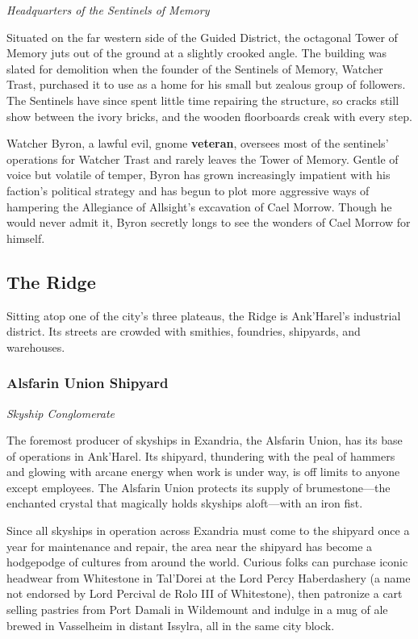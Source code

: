 \documentclass[a4paper, 11pt, bg=full, twocolumn, nooutline]{dndbook}
\begin{document}
\textit{Headquarters of the Sentinels of Memory}

Situated on the far western side of the Guided District, the octagonal Tower of Memory juts out of the ground at a slightly crooked angle. The building was slated for demolition when the founder of the Sentinels of Memory, Watcher Trast, purchased it to use as a home for his small but zealous group of followers. The Sentinels have since spent little time repairing the structure, so cracks still show between the ivory bricks, and the wooden floorboards creak with every step.

Watcher Byron, a lawful evil, gnome \textbf{veteran}, oversees most of the sentinels' operations for Watcher Trast and rarely leaves the Tower of Memory. Gentle of voice but volatile of temper, Byron has grown increasingly impatient with his faction's political strategy and has begun to plot more aggressive ways of hampering the Allegiance of Allsight's excavation of Cael Morrow. Though he would never admit it, Byron secretly longs to see the wonders of Cael Morrow for himself.

\subsection{The Ridge}

Sitting atop one of the city's three plateaus, the Ridge is Ank'Harel's industrial district. Its streets are crowded with smithies, foundries, shipyards, and warehouses.

\subsubsection{Alsfarin Union Shipyard}

\textit{Skyship Conglomerate}

The foremost producer of skyships in Exandria, the Alsfarin Union, has its base of operations in Ank'Harel. Its shipyard, thundering with the peal of hammers and glowing with arcane energy when work is under way, is off limits to anyone except employees. The Alsfarin Union protects its supply of brumestone---the enchanted crystal that magically holds skyships aloft---with an iron fist.

Since all skyships in operation across Exandria must come to the shipyard once a year for maintenance and repair, the area near the shipyard has become a hodgepodge of cultures from around the world. Curious folks can purchase iconic headwear from Whitestone in Tal'Dorei at the Lord Percy Haberdashery (a name not endorsed by Lord Percival de Rolo III of Whitestone), then patronize a cart selling pastries from Port Damali in Wildemount and indulge in a mug of ale brewed in Vasselheim in distant Issylra, all in the same city block.
\end{document}
